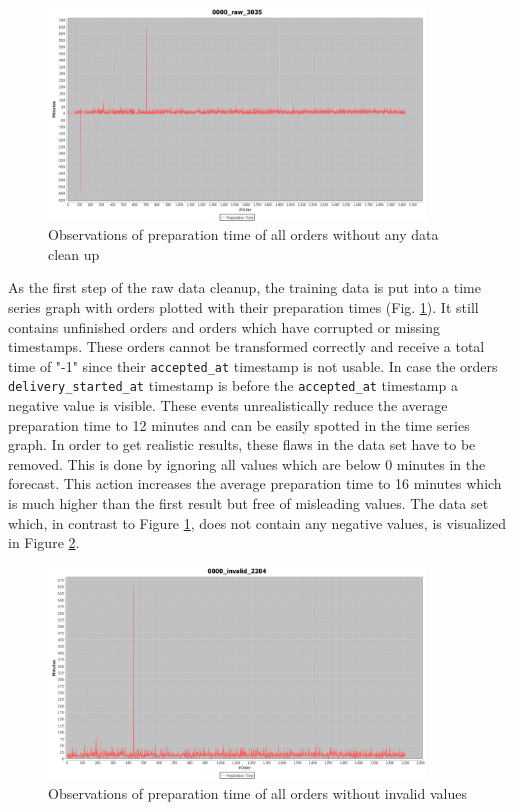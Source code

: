 \begin{figure}[h]
\begin{center}
\includegraphics[width=10cm]{images/0000_raw_3035.png}
\caption{Observations of preparation time of all orders without any data clean up}
\label{fig:0000_raw_3035}
\end{center}
\end{figure}

As the first step of the raw data cleanup, the training data is put into a time series graph with orders plotted with their preparation times (Fig. \ref{fig:0000_raw_3035}). It still contains unfinished orders and orders which have corrupted or missing timestamps. These orders cannot be transformed correctly and receive a total time of "-1" since their \texttt{accepted\_at} timestamp is not usable. In case the orders \texttt{delivery\_started\_at} timestamp is before the \texttt{accepted\_at} timestamp a negative value is visible. These events unrealistically reduce the average preparation time to 12 minutes and can be easily spotted in the time series graph. In order to get realistic results, these flaws in the data set have to be removed. This is done by ignoring all values which are below 0 minutes in the forecast. This action increases the average preparation time to 16 minutes which is much higher than the first result but free of misleading values. The data set which, in contrast to Figure \ref{fig:0000_raw_3035}, does not contain any negative values, is visualized in Figure \ref{fig:0000_invalid_2204}.

\begin{figure}[h]
\begin{center}
\includegraphics[width=10cm]{images/0000_invalid_2204.png}
\caption{Observations of preparation time of all orders without invalid values}
\label{fig:0000_invalid_2204}
\end{center}
\end{figure}

